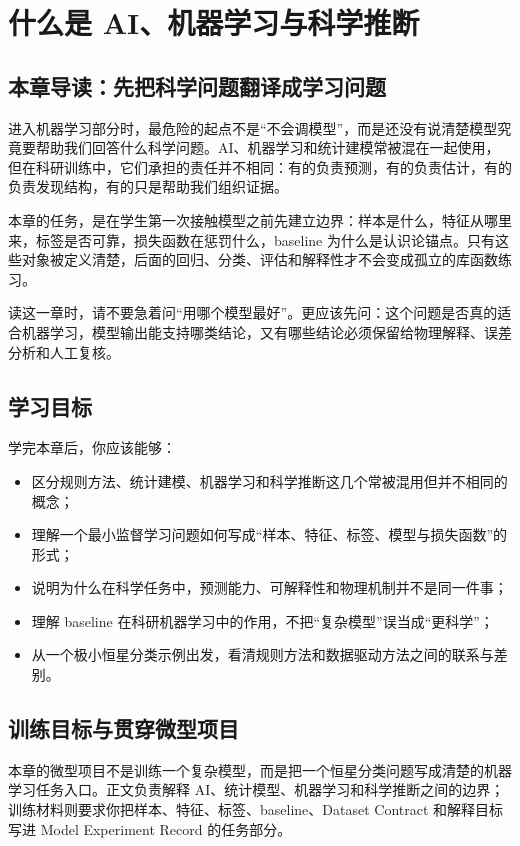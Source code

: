 \chapter{什么是 AI、机器学习与科学推断}

\section{本章导读：先把科学问题翻译成学习问题}

进入机器学习部分时，最危险的起点不是“不会调模型”，而是还没有说清楚模型究竟要帮助我们回答什么科学问题。AI、机器学习和统计建模常被混在一起使用，但在科研训练中，它们承担的责任并不相同：有的负责预测，有的负责估计，有的负责发现结构，有的只是帮助我们组织证据。

本章的任务，是在学生第一次接触模型之前先建立边界：样本是什么，特征从哪里来，标签是否可靠，损失函数在惩罚什么，baseline 为什么是认识论锚点。只有这些对象被定义清楚，后面的回归、分类、评估和解释性才不会变成孤立的库函数练习。

读这一章时，请不要急着问“用哪个模型最好”。更应该先问：这个问题是否真的适合机器学习，模型输出能支持哪类结论，又有哪些结论必须保留给物理解释、误差分析和人工复核。

\section{学习目标}

学完本章后，你应该能够：

\begin{itemize}
    \item 区分规则方法、统计建模、机器学习和科学推断这几个常被混用但并不相同的概念；
    \item 理解一个最小监督学习问题如何写成“样本、特征、标签、模型与损失函数”的形式；
    \item 说明为什么在科学任务中，预测能力、可解释性和物理机制并不是同一件事；
    \item 理解 baseline 在科研机器学习中的作用，不把“复杂模型”误当成“更科学”；
    \item 从一个极小恒星分类示例出发，看清规则方法和数据驱动方法之间的联系与差别。
\end{itemize}

\section{训练目标与贯穿微型项目}

本章的微型项目不是训练一个复杂模型，而是把一个恒星分类问题写成清楚的机器学习任务入口。正文负责解释 AI、统计模型、机器学习和科学推断之间的边界；训练材料则要求你把样本、特征、标签、baseline、Dataset Contract 和解释目标写进 Model Experiment Record 的任务部分。

